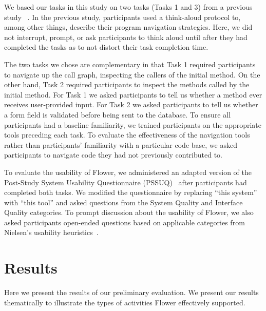 \documentclass[conference]{IEEEtran}
\begin{document}
We based our tasks in this study on two tasks (Tasks 1 and 3) from a previous study ~\cite{Smith2015}.
In the previous study, participants used a think-aloud protocol to, among other things, describe their program navigation strategies.
Here, we did not interrupt, prompt, or ask participants to think aloud until after they had completed the tasks as to not distort their task completion time.

The two tasks we chose are complementary in that Task 1 required participants to navigate up the call graph, inspecting the callers of the initial method. 
On the other hand, Task 2 required participants to inspect the methods called by the initial method.
For Task 1 we asked participants to tell us whether a method ever receives user-provided input.
For Task 2 we asked participants to tell us whether a form field is validated before being sent to the database.
To ensure all participants had a baseline familiarity, we trained participants on the appropriate tools preceding each task. 
To evaluate the effectiveness of the navigation tools rather than participants' familiarity with a particular code base, we asked participants to navigate code they had not previously contributed to. 


To evaluate the usability of Flower, we administered an adapted version of the Post-Study System Usability Questionnaire (PSSUQ)~\cite{Lewis95ibmcomputer} after participants had completed both tasks. We modified the questionnaire by replacing ``this system'' with ``this tool'' and asked questions from the System Quality and Interface Quality categories.
To prompt discussion about the usability of Flower, we also asked participants open-ended questions based on applicable categories from Nielsen's usability heuristics~\cite{Nielsen1992}.


\section{Results}
Here we present the results of our preliminary evaluation. 
We present our results thematically to illustrate the types of activities Flower  effectively supported.

\end{document}
